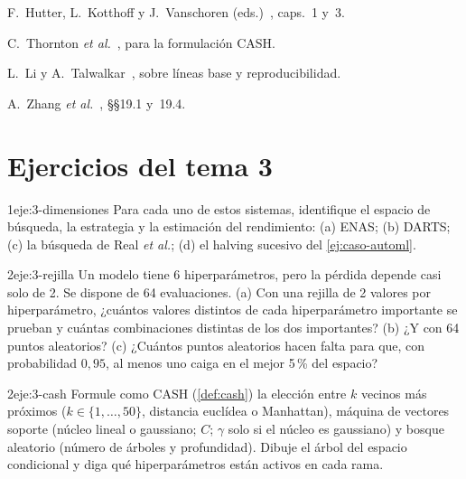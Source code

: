\begin{lecturas}
\item F.~Hutter, L.~Kotthoff y J.~Vanschoren (eds.)~\cite{automl}, caps.~1 y~3.
\item C.~Thornton \emph{et al.}~\cite{autoweka}, para la formulación CASH.
\item L.~Li y A.~Talwalkar~\cite{lt}, sobre líneas base y reproducibilidad.
\item A.~Zhang \emph{et al.}~\cite{d2l}, §§19.1 y~19.4.
\end{lecturas}

\section*{Ejercicios del tema 3}

\begin{ejercicio}{1}{eje:3-dimensiones}
Para cada uno de estos sistemas, identifique el espacio de búsqueda, la estrategia y la estimación del rendimiento: (a) ENAS; (b) DARTS; (c) la búsqueda de Real \emph{et al.}; (d) el halving sucesivo del \cref{ej:caso-automl}.
\end{ejercicio}

\begin{ejercicio}{2}{eje:3-rejilla}
Un modelo tiene 6 hiperparámetros, pero la pérdida depende casi solo de 2. Se dispone de 64 evaluaciones. (a) Con una rejilla de 2 valores por hiperparámetro, ¿cuántos valores distintos de cada hiperparámetro importante se prueban y cuántas combinaciones distintas de los dos importantes? (b) ¿Y con 64 puntos aleatorios? (c) ¿Cuántos puntos aleatorios hacen falta para que, con probabilidad $0{,}95$, al menos uno caiga en el mejor 5\,\% del espacio?
\end{ejercicio}

\begin{ejercicio}{2}{eje:3-cash}
Formule como CASH (\cref{def:cash}) la elección entre $k$ vecinos más próximos ($k\in\{1,\dots,50\}$, distancia euclídea o Manhattan), máquina de vectores soporte (núcleo lineal o gaussiano; $C$; $\gamma$ solo si el núcleo es gaussiano) y bosque aleatorio (número de árboles y profundidad). Dibuje el árbol del espacio condicional y diga qué hiperparámetros están activos en cada rama.
\end{ejercicio}

